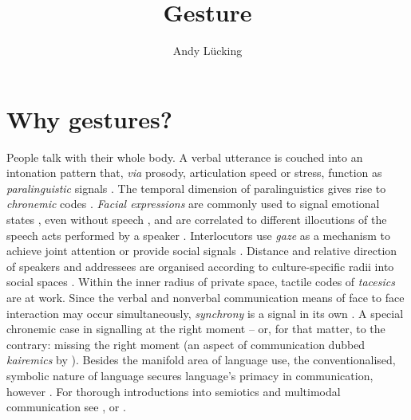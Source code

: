 \documentclass[output=paper]{langsci/langscibook}
\author{Andy Lücking\affiliation{Goethe-Universität Frankfurt}}
\title{Gesture}
\begin{document}
\label{chap-gesture}

\avmoptions{}

\section{Why gestures?} 
\label{sec:why-gestures}

People talk with their whole body. 
%
A verbal utterance is couched into an intonation pattern that, \textit{via} prosody, articulation speed or stress, function as \emph{paralinguistic} signals \citep[e.g.]{Birdwhistell:1970}. 
%
The temporal dimension of paralinguistics gives rise to \emph{chronemic} codes \citep{Poyatos:1975,Bruneau:1980}. \emph{Facial expressions} are commonly used to signal emotional states \citep{Ekman:Friesen:1978}, even without speech \citep{Argyle:1975}, and are correlated to different illocutions of the speech acts performed by a speaker \citep{Domaneschi:Passarelli:Chiorri:2017}.
%
Interlocutors use \emph{gaze} as a mechanism to achieve joint attention \citep{Argyle:Cook:1976} or provide social signals \citep{Kendon:1967}. Distance and relative direction of speakers and addressees are organised according to culture-specific radii into social spaces \citep[\emph{proxemics}][]{Hall:1968}. 
%
Within the inner radius of private space, tactile codes of \emph{tacesics} \citep{Kauffman:1971} are at work. Since the verbal and nonverbal communication means of face to face interaction may occur simultaneously, \emph{synchrony} is a signal in its own \citep{Wiltshire:2007}. 
%
A special chronemic case in signalling at the right moment -- or, for that matter, to the contrary: missing the right moment (an aspect of communication dubbed \emph{kairemics} by \citet{Luecking:Pfeiffer:2012}).
%
Besides the manifold area of language use, the conventionalised, symbolic nature of language secures language's primacy in communication, however \citep{de:Ruiter:2004}.
%
For thorough introductions into semiotics and multimodal communication see \citet{Noeth:1990}, \citet{Posner:Robering:Sebeok:1997:2004} or \citet{Mueller:Cienki:Fricke:Ladewig:McNeill:Tessendorf:2013:2014}.
\end{document}
